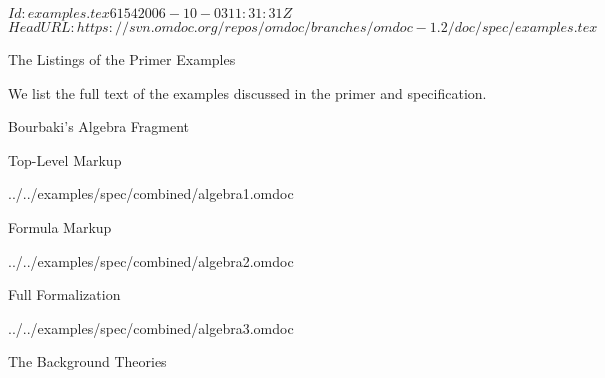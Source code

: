 \svnInfo $Id: examples.tex 6154 2006-10-03 11:31:31Z  $
\svnKeyword $HeadURL: https://svn.omdoc.org/repos/omdoc/branches/omdoc-1.2/doc/spec/examples.tex $

\begin{tchapter}[id=examples]{The Listings of the Primer Examples}

We list the full text of the examples discussed in the {\omdoc} primer and
specification. 

\begin{tsection}[id=examples:algebra]{Bourbaki's Algebra  Fragment}

\begin{tsubsection}[id=examples:algebra1]{Top-Level Markup}


  {../../examples/spec/combined/algebra1.omdoc}
\end{tsubsection}

\begin{tsubsection}[id=examples:algebra2]{Formula Markup}


  {../../examples/spec/combined/algebra2.omdoc}
\end{tsubsection}

\begin{tsubsection}[id=examples:algebra3]{Full Formalization}


  {../../examples/spec/combined/algebra3.omdoc}
\end{tsubsection}

\begin{tsubsection}[id=examples:background]{The Background Theories}


\end{tsubsection}
\end{tsection}
\end{tchapter}
